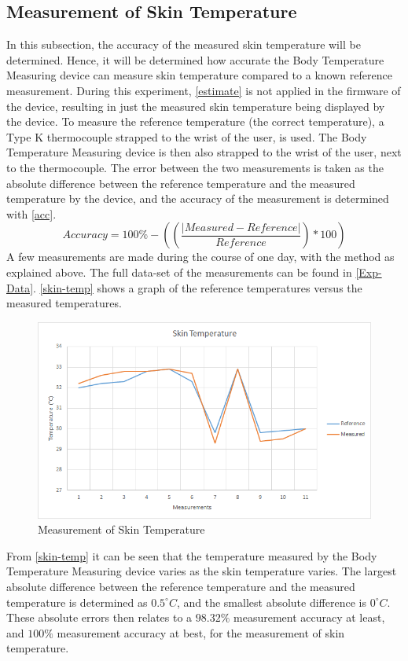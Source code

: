 \subsection{Measurement of Skin Temperature}
In this subsection, the accuracy of the measured skin temperature will be determined. Hence, it will be determined how accurate the Body Temperature Measuring device can measure skin temperature compared to a known reference measurement. During this experiment, \autoref{estimate} is not applied in the firmware of the device, resulting in just the measured skin temperature being displayed by the device. To measure the reference temperature (the correct temperature), a Type K thermocouple strapped to the wrist of the user, is used. The Body Temperature Measuring device is then also strapped to the wrist of the user, next to the thermocouple. The error between the two measurements is taken as the absolute difference between the reference temperature and the measured temperature by the device, and the accuracy of the measurement is determined with \autoref{acc}.
\begin{equation}
    Accuracy = 100\% - ((\frac{|Measured - Reference|}{Reference})*100)
    \label{acc}
\end{equation}
\noindent
A few measurements are made during the course of one day, with the method as explained above. The full data-set of the measurements can be found in \autoref{Exp-Data}. \autoref{skin-temp} shows a graph of the reference temperatures versus the measured temperatures. 
\begin{figure}[H]
	\centering
	\includegraphics[scale=0.7]{img/Skin-Temp.png}
	\caption{Measurement of Skin Temperature}
	\label{skin-temp}
\end{figure}
\noindent
From \autoref{skin-temp} it can be seen that the temperature measured by the Body Temperature Measuring device varies as the skin temperature varies. The largest absolute difference between the reference temperature and the measured temperature is determined as $ 0.5^{\circ} C $, and the smallest absolute difference is $ 0^{\circ} C $. These absolute errors then relates to a $ 98.32 \%$ measurement accuracy at least, and $ 100 \% $ measurement accuracy at best, for the measurement of skin temperature. 

